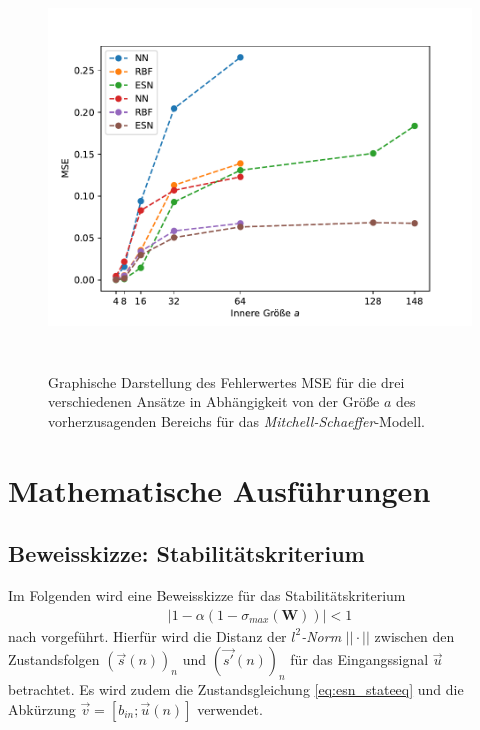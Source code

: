 \begin{appendices}
\begin{figure}[h]
	\centering
	\includegraphics[height=4.2in]{figures/results/inner_cross_prediction/mitchell_error_size_comparison.pdf}
	\caption{Graphische Darstellung des Fehlerwertes MSE für die drei verschiedenen Ansätze in Abhängigkeit von der Größe $a$ des vorherzusagenden Bereichs für das \textit{Mitchell-Schaeffer}-Modell.}
	\label{fig:apx_inner_prediction_error_size_comparison_ms}
\end{figure} 


\chapter{Mathematische Ausführungen}
\section{Beweisskizze: Stabilitätskriterium}
\label{sc:apx_math_stability_proof}
Im Folgenden wird eine Beweisskizze für das Stabilitätskriterium
\begin{align*}
|1-\alpha(1-\sigma_{max}(\mathbf{W}))| < 1
\end{align*}
nach \cite{jaeger2010} vorgeführt. Hierfür wird die Distanz der \textit{$l^2$-Norm} $||\cdot||$ zwischen den Zustandsfolgen $(\vec{s}(n))_n$ und $(\vec{s'}(n))_n$ für das Eingangssignal $\vec{u}$ betrachtet. Es wird zudem die Zustandsgleichung \ref{eq:esn_stateeq} und die Abkürzung $\vec{v} = [b_{in}; \vec{u}(n)]$ verwendet. 


\end{appendices}
